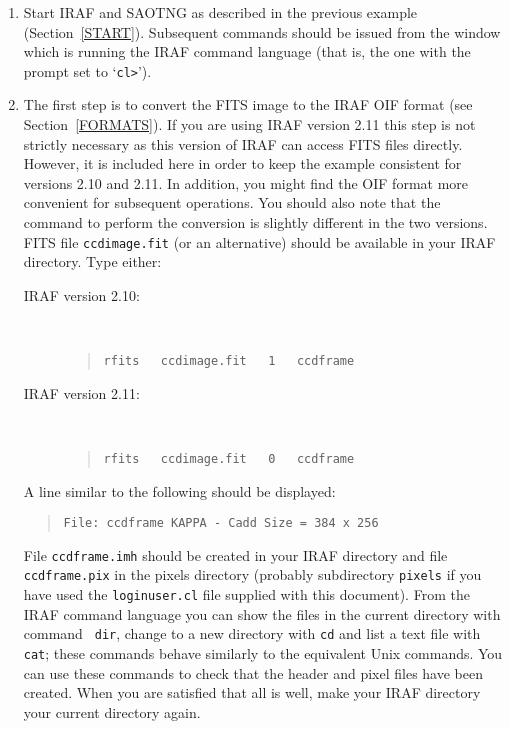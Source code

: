 \documentclass[twoside,11pt]{article}
\begin{document}
\begin{enumerate}

  \item Start IRAF and SAOTNG as described in the previous example
   (Section~\ref{START}).  Subsequent commands should be issued from
   the window which is running the IRAF command language (that is, the
   one with the prompt set to `\verb-cl>-').

  \item The first step is to convert the FITS image to the IRAF OIF
   format (see Section~\ref{FORMATS}).  If you are using IRAF version 2.11
   this step is not strictly necessary as this version of IRAF can access
   FITS files directly.  However, it is included here in order to
   keep the example consistent for versions 2.10 and 2.11.  In addition,
   you might find the OIF format more convenient for subsequent operations.
   You should also note that the command to perform the conversion is
   slightly different in the two versions.  FITS file {\tt ccdimage.fit}
   (or an alternative) should be available in your IRAF directory.
   Type either:

  \begin{description}

    \item[{\rm IRAF version 2.10:}] ~

    \begin{quote}
     {\tt rfits ~ ccdimage.fit ~ 1 ~ ccdframe}
    \end{quote}

    \item[{\rm IRAF version 2.11:}] ~

    \begin{quote}
     {\tt rfits ~ ccdimage.fit ~ 0 ~ ccdframe}
    \end{quote}

  \end{description}

   A line similar to the following should be displayed:

  \begin{quote}
   {\tt File: ccdframe  KAPPA - Cadd          Size = 384 x 256}
  \end{quote}

   File {\tt ccdframe.imh} should be created in your IRAF directory
   and file {\tt ccdframe.pix} in the pixels directory (probably
   subdirectory {\tt pixels} if you have used the {\tt loginuser.cl}
   file supplied with this document).  From the IRAF command language
   you can show the files in the current directory with command {\tt
   dir}, change to a new directory with {\tt cd} and list a text
   file with {\tt cat}; these commands behave similarly to the
   equivalent Unix commands.  You can use these commands to check
   that the header and pixel files have been created.  When you are
   satisfied that all is well, make your IRAF directory your current
   directory again.


\end{enumerate}
\end{document}
